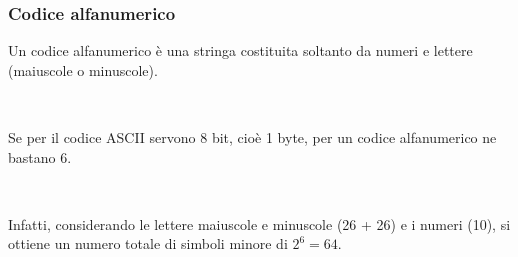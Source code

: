 \documentclass[handout]{beamer}
\begin{document}
\begin{frame}
\frametitle{Codice alfanumerico}
Un codice alfanumerico è una stringa costituita soltanto da numeri e lettere (maiuscole o minuscole).\pause

~

Se per il codice ASCII servono 8 bit, cioè 1 byte, per un codice alfanumerico ne bastano 6.\pause

~

Infatti, considerando le lettere maiuscole e minuscole (26 + 26) e i numeri (10), si ottiene un numero totale di simboli minore di $ 2^6 = 64 $.
\end{frame}
\end{document}
